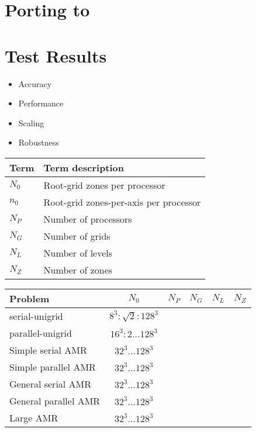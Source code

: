 \documentclass[10pt]{article}
\begin{document}
\section{Porting to \enzo}

\section{Test Results} \label{s:results}

\begin{itemize}
\item Accuracy
\item Performance
\item Scaling
\item Robustness
\end{itemize}


\begin{tabular}{l|l} \\
\textbf{Term} & \textbf{Term description} \\ \hline
$N_0$ & Root-grid zones per processor \\
$n_0$ & Root-grid zones-per-axis  per processor \\
$N_P$ & Number of processors \\
$N_G$ & Number of grids \\
$N_L$ & Number of levels \\
$N_Z$ & Number of zones \\
\end{tabular}

\begin{tabular}{l|ccccc} \\
Problem & $N_0$ & $N_P$ & $N_G$ & $N_L$ & $N_Z$ \\ \hline
serial-unigrid       & $8^3:\sqrt{2}:128^3$ & & & \\
parallel-unigrid     & $16^3:2\ldots 128^3$ & & & \\
Simple serial AMR    & $32^3\ldots 128^3$ & & & \\
Simple parallel AMR  & $32^3\ldots 128^3$ & & & \\
General serial AMR   & $32^3\ldots 128^3$ & & & \\
General parallel AMR & $32^3\ldots 128^3$ & & & \\
Large AMR            & $32^3\ldots 128^3$ & & & \\
\end{tabular}
\end{document}
